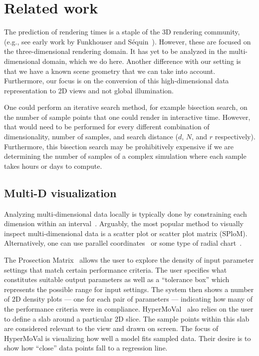 \section{Related work}
\label{sec:relatedwork}

The prediction of rendering times is a staple of the 3D rendering community,
(e.g., see early work by Funkhouser and
S{\'e}quin~\cite{Funkhouser:1993}).  However, these are focused on the 
three-dimensional
rendering domain. It has yet to be analyzed in the multi-dimensional domain,
which we do here.  
Another difference with our setting is that we have a known scene geometry 
that we can take into account.
Furthermore, our focus is on the conversion of this high-dimensional data representation
to 2D views and not global illumination.

One could perform an iterative search method, for example bisection search, on
the number of sample points that one could render in interactive time. However,
that would need to be performed for every different combination of
dimensionality, number of samples, and search distance ($d$, $N$, and $r$
respectively). Furthermore, this bisection search may be prohibitively
expensive if we are determining the number of samples of a complex simulation
where each sample takes hours or days to compute. 

\subsection{Multi-D visualization}

Analyzing multi-dimensional data locally is typically done by constraining
each dimension within an interval~\cite{Shneiderman:1994}. Arguably, the
most popular method to visually inspect multi-dimensional data is a scatter
plot or scatter plot matrix (SPloM). Alternatively, one can use
parallel
coordinates~\cite{Inselberg:1985} or some type of radial 
chart~\cite{Jayaraman:2002}.

The
Prosection Matrix~\cite{Tweedie:1998} allows the user to explore the density of
input parameter settings that match certain performance criteria. The user
specifies what constitutes suitable output parameters as well as a ``tolerance
box'' which represents the possible range for input settings. The system then
shows a number of 2D density plots --- one for each pair of parameters ---
indicating how many of the performance criteria were in compliance.
HyperMoVal~\cite{Piringer:2010} also relies on the user to define a slab around
a particular 2D slice. The sample points within this slab are considered
relevant to the view and drawn on screen. The focus of HyperMoVal is
visualizing how well a model fits sampled data. Their desire is to show how
``close'' data points fall to a regression line.

